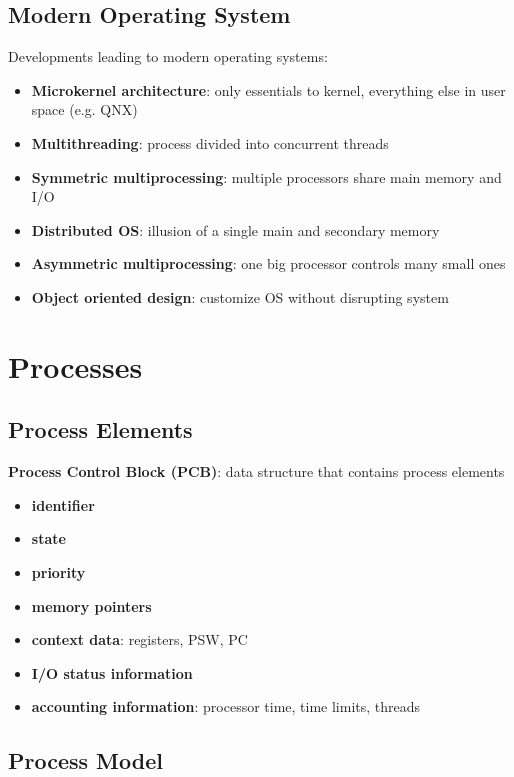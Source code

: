 \documentclass[]{article}
\theoremstyle{definition}
\begin{document}
		\subsection{Modern Operating System}
			Developments leading to modern operating systems:
			\begin{itemize}			
				\item \textbf{Microkernel architecture}:	only essentials to kernel, everything else in user space (e.g. QNX)
				\item \textbf{Multithreading}:	process divided into concurrent threads
				\item \textbf{Symmetric multiprocessing}:	multiple processors share main memory and I/O
				\item \textbf{Distributed OS}:	illusion of a single main and secondary memory
				\item \textbf{Asymmetric multiprocessing}:	one big processor controls many small ones			
				\item \textbf{Object oriented design}:	customize OS without disrupting system
			\end{itemize}
	\section{Processes}
		\subsection{Process Elements}
			\textbf{Process Control Block (PCB)}: data structure that contains process elements
			\begin{itemize}
				\item \textbf{identifier}
				\item \textbf{state}
				\item \textbf{priority}
				\item \textbf{memory pointers}
				\item \textbf{context data}: registers, PSW, PC
				\item \textbf{I/O status information}
				\item \textbf{accounting information}: processor time, time limits, threads
			\end{itemize}
		\subsection{Process Model}
\end{document}
